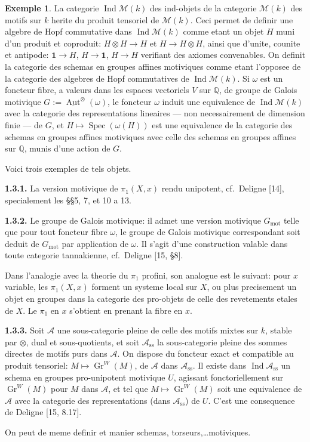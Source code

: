 \documentclass[11pt,a4paper]{article}
\theoremstyle{plain}
\theoremstyle{definition}
\newtheorem{example}[theorem]{Exemple}
\DeclareMathOperator{\Spec}{Spec}
\DeclareMathOperator{\Aut}{Aut}
\DeclareMathOperator{\Gr}{Gr}
\DeclareMathOperator{\Ind}{Ind}
\newcommand{\Q}{\mathbb{Q}}
\DeclareMathOperator{\mot}{mot}
\begin{document}
\begin{example}
La categorie $\Ind\mathcal{M}(k)$ des ind-objets de la categorie $\mathcal{M}(k)$ des motifs sur $k$ herite du produit tensoriel de $\mathcal{M}(k)$. Ceci permet de definir une algebre de Hopf commutative dans $\Ind\mathcal{M}(k)$ comme etant un objet $H$ muni d'un produit et coproduit: $H \otimes H \to H$ et $H \to H \otimes H$, ainsi que d'unite, counite et antipode: $\mathbf{1} \to H$, $H \to \mathbf{1}$, $H \to H$ verifiant des axiomes convenables. On definit la categorie des schemas en groupes affines motiviques comme etant l'opposee de la categorie des algebres de Hopf commutatives de $\Ind\mathcal{M}(k)$. Si $\omega$ est un foncteur fibre, a valeurs dans les espaces vectoriels $V$ sur $\Q$, de groupe de Galois motivique $G := \underline{\Aut}^{\otimes}(\omega)$, le foncteur $\omega$ induit une equivalence de $\Ind\mathcal{M}(k)$ avec la categorie des representations lineaires --- non necessairement de dimension finie --- de $G$, et $H \mapsto \Spec(\omega(H))$ est une equivalence de la categorie des schemas en groupes affines motiviques avec celle des schemas en groupes affines sur $\Q$, munis d'une action de $G$.

Voici trois exemples de tels objets.

\textbf{1.3.1.} La version motivique de $\pi_1(X, x)$ rendu unipotent, cf.~Deligne [14], specialement les \S\S5, 7, et 10 a 13.

\textbf{1.3.2.} Le groupe de Galois motivique: il admet une version motivique $G_{\mot}$ telle que pour tout foncteur fibre $\omega$, le groupe de Galois motivique correspondant soit deduit de $G_{\mot}$ par application de $\omega$. Il s'agit d'une construction valable dans toute categorie tannakienne, cf.~Deligne [15, \S8].

Dans l'analogie avec la theorie du $\pi_1$ profini, son analogue est le suivant: pour $x$ variable, les $\pi_1(X, x)$ forment un systeme local sur $X$, ou plus precisement un objet en groupes dans la categorie des pro-objets de celle des revetements etales de $X$. Le $\pi_1$ en $x$ s'obtient en prenant la fibre en $x$.

\textbf{1.3.3.} Soit $\mathcal{A}$ une sous-categorie pleine de celle des motifs mixtes sur $k$, stable par $\otimes$, dual et sous-quotients, et soit $\mathcal{A}_{\mathrm{ss}}$ la sous-categorie pleine des sommes directes de motifs purs dans $\mathcal{A}$. On dispose du foncteur exact et compatible au produit tensoriel: $M \mapsto \Gr^W(M)$, de $\mathcal{A}$ dans $\mathcal{A}_{\mathrm{ss}}$. Il existe dans $\Ind\mathcal{A}_{\mathrm{ss}}$ un schema en groupes pro-unipotent motivique $U$, agissant fonctoriellement sur $\Gr^W(M)$ pour $M$ dans $\mathcal{A}$, et tel que $M \mapsto \Gr^W(M)$ soit une equivalence de $\mathcal{A}$ avec la categorie des representations (dans $\mathcal{A}_{\mathrm{ss}}$) de $U$. C'est une consequence de Deligne [15, 8.17].

On peut de meme definir et manier schemas, torseurs,\ldots motiviques.
\end{example}
\end{document}
